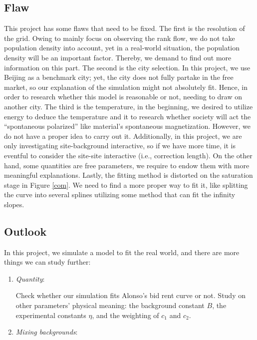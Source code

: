 \documentclass[10pt]{article}
\begin{document}
\begin{multicols}{2}
    \subsection{Flaw}
        This project has some flaws that need to be fixed. The first is the resolution of the grid. Owing to mainly focus on observing the rank flow, we do not take population density into account, yet in a real-world situation, the population density will be an important factor. Thereby, we demand to find out more information on this part. The second is the city selection. In this project, we use Beijing as a benchmark city; yet, the city does not fully partake in the free market, so our explanation of the simulation might not absolutely fit. Hence, in order to research whether this model is reasonable or not, needing to draw on another city. The third is the temperature, in the beginning, we desired to utilize energy to deduce the temperature and it to research whether society will act the ``spontaneous polarized'' like material's spontaneous magnetization. However, we do not have a proper idea to carry out it. Additionally, in this project, we are only investigating site-background interactive, so if we have more time, it is eventful to consider the site-site interactive (i.e., correction length). On the other hand, some quantities are free parameters, we require to endow them with more meaningful explanations. Lastly, the fitting method is distorted on the saturation stage in Figure \ref{com}. We need to find a more proper way to fit it, like splitting the curve into several splines utilizing some method that can fit the infinity slopes. 
        
    \subsection{Outlook}
        In this project, we simulate a model to fit the real world, and there are more things we can study further:
        \begin{enumerate}
            \item \emph{Quantity}:
            
            Check whether our simulation fits Alonso's bid rent curve or not. Study on other parameters’ physical meaning: the background constant $B$, the experimental constants $\eta$, and the weighting of $c_{1}$ and $c_{2}$.
            
            \item \emph{Mixing backgrounds}:
            

\end{enumerate}
\end{multicols}
\end{document}
